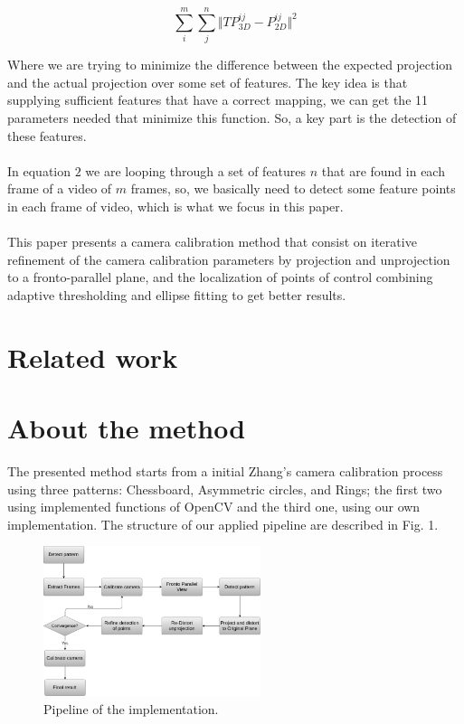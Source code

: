 \documentclass[journal]{IEEEtran}
\begin{document}
\begin{equation}
  \sum^{m}_{i} \sum^{n}_{j} \Vert TP^{ij}_{3D} - P^{ij}_{2D} \Vert^{2}
\end{equation}

Where we are trying to minimize the difference between the expected projection and the actual projection over some set of features. The key idea is that supplying sufficient features that have a correct mapping, we can get the 11 parameters needed that minimize this function. So, a key part is the detection of these features.
\\
\\
In equation $2$ we are looping through a set of features $n$ that are found in each frame of a video of $m$ frames, so, we basically need to detect some feature points in each frame of video, which is what we focus in this paper.
\\
\\
This paper presents a camera calibration method that consist on iterative refinement of the camera calibration parameters by projection and unprojection to a fronto-parallel plane, and the localization of points of control combining adaptive thresholding and ellipse fitting to get better results.

\section{Related work}


\section{About the method}
The presented method starts from a initial Zhang's camera calibration process using three patterns: Chessboard, Asymmetric circles, and Rings; the first two using implemented functions of OpenCV and the third one, using our own implementation. The structure of our applied pipeline are described in Fig. 1.

\begin{figure}[H]
\centering
\includegraphics[width=2.5in]{_img/img_report4_pipeline.png}
\caption{Pipeline of the implementation.}
\end{figure}
\end{document}
